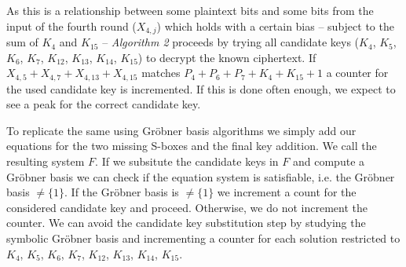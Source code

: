 As this is a relationship between some plaintext bits and some bits from the input of the fourth round ($X_{4,j}$) which holds with a certain bias -- subject to the sum of $K_{4}$ and $K_{15}$ -- \emph{Algorithm 2} proceeds by trying all candidate keys ($K_{4}$, $K_{5}$, $K_{6}$, $K_{7}$, $K_{12}$, $K_{13}$, $K_{14}$, $K_{15}$) to decrypt the known ciphertext. If $X_{4,5} + X_{4,7} + X_{4,13} + X_{4,15}$ matches $P_{4} + P_{6} + P_{7}  + K_{4} + K_{15} + 1$ a counter for the used candidate key is incremented. If this is done often enough, we expect to see a peak for the correct candidate key.                                                                                                                                                                                                                                                                                                                                                                    

To replicate the same using Gröbner basis algorithms we simply add our equations for the two missing S-boxes and the final key addition. We call the resulting system $F$. If we subsitute the candidate keys in $F$ and compute a Gröbner basis we can check if the equation system is satisfiable, i.e. the Gröbner basis $\neq \{1\}$. If the Gröbner basis is $\neq \{1\}$ we increment a count for the considered candidate key and proceed. Otherwise, we do not increment the counter. We can avoid the candidate key substitution step by studying the symbolic Gröbner basis and incrementing a counter for each solution restricted to $K_{4}$, $K_{5}$, $K_{6}$, $K_{7}$, $K_{12}$, $K_{13}$, $K_{14}$, $K_{15}$.


